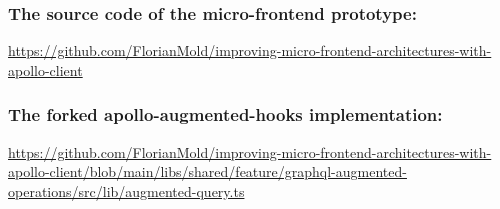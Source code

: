 \documentclass[MSE,Master,english]{twbook}%
\begin{document}
\subsubsection{The source code of the micro-frontend prototype:} 
\url{https://github.com/FlorianMold/improving-micro-frontend-architectures-with-apollo-client}

\subsubsection{The forked apollo-augmented-hooks implementation:} 
\url{https://github.com/FlorianMold/improving-micro-frontend-architectures-with-apollo-client/blob/main/libs/shared/feature/graphql-augmented-operations/src/lib/augmented-query.ts}

\end{document}
